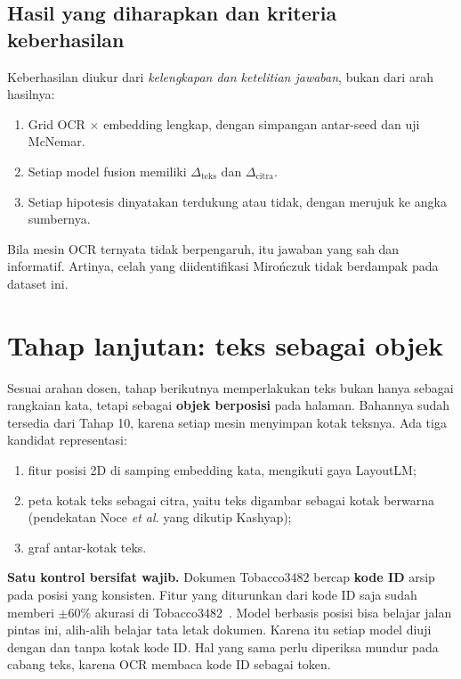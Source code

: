 \documentclass[11pt,a4paper]{article}
\begin{document}
\subsection{Hasil yang diharapkan dan kriteria keberhasilan}

Keberhasilan diukur dari \emph{kelengkapan dan ketelitian jawaban}, bukan dari arah
hasilnya:
\begin{enumerate}
  \item Grid OCR $\times$ embedding lengkap, dengan simpangan antar-seed dan uji
  McNemar.
  \item Setiap model fusion memiliki $\Delta_\text{teks}$ dan $\Delta_\text{citra}$.
  \item Setiap hipotesis dinyatakan terdukung atau tidak, dengan merujuk ke angka
  sumbernya.
\end{enumerate}
Bila mesin OCR ternyata tidak berpengaruh, itu jawaban yang sah dan informatif. Artinya,
celah yang diidentifikasi Miro\'nczuk tidak berdampak pada dataset ini.

\section{Tahap lanjutan: teks sebagai objek}\label{sec:lanjut}

Sesuai arahan dosen, tahap berikutnya memperlakukan teks bukan hanya sebagai rangkaian
kata, tetapi sebagai \textbf{objek berposisi} pada halaman. Bahannya sudah tersedia dari
Tahap 10, karena setiap mesin menyimpan kotak teksnya. Ada tiga kandidat representasi:

\begin{enumerate}
  \item fitur posisi 2D di samping embedding kata, mengikuti gaya LayoutLM;
  \item peta kotak teks sebagai citra, yaitu teks digambar sebagai kotak berwarna
  (pendekatan Noce \textit{et al.} yang dikutip Kashyap);
  \item graf antar-kotak teks.
\end{enumerate}

\textbf{Satu kontrol bersifat wajib.} Dokumen Tobacco3482 bercap \textbf{kode ID} arsip
pada posisi yang konsisten. Fitur yang diturunkan dari kode ID saja sudah memberi
$\pm$60\% akurasi di Tobacco3482~\cite{larson2025}. Model berbasis posisi bisa belajar
jalan pintas ini, alih-alih belajar tata letak dokumen. Karena itu setiap model diuji
dengan dan tanpa kotak kode ID. Hal yang sama perlu diperiksa mundur pada cabang teks,
karena OCR membaca kode ID sebagai token.
\end{document}

